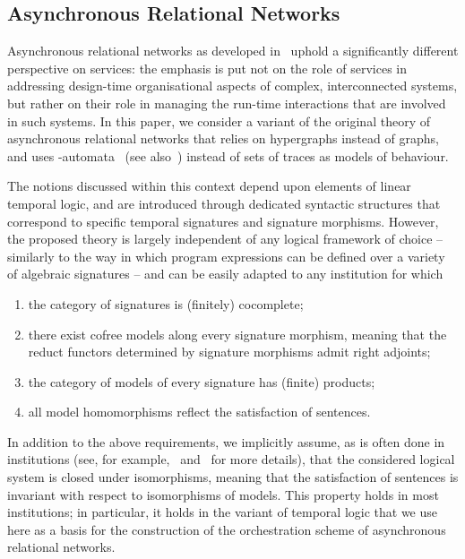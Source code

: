\documentclass{LMCS}
\begin{document}
\subsection{Asynchronous Relational Networks}
\label{subsection:asynchronous-relational-networks}

Asynchronous relational networks as developed in~\cite{Fiadeiro-Lopes:An-interface-theory-for-service-oriented-design-2013} uphold a significantly different perspective on services:  the emphasis is put not on the role of services in addressing design-time organisational aspects of complex, interconnected systems, but rather on their role in managing the run-time interactions that are involved in such systems.
In this paper, we consider a variant of the original theory of asynchronous relational networks that relies on hypergraphs instead of graphs, and uses \nb-automata~\cite{Thomas:Automata-on-infinite-objects-1990} (see also~\cite{Perrin-Pin:Infinite-Words-2004}) instead of sets of traces as models of behaviour.

The notions discussed within this context depend upon elements of linear temporal logic, and are introduced through dedicated syntactic structures that correspond to specific temporal signatures and signature morphisms.
However, the proposed theory is largely independent of any logical framework of choice -- similarly to the way in which program expressions can be defined over a variety of algebraic signatures -- and can be easily adapted to any institution for which
\begin{enumerate}

\item\label{assumption:ARN-first} the category of signatures is (finitely) cocomplete;

\item there exist cofree models along every signature morphism, meaning that the reduct functors determined by signature morphisms admit right adjoints;

\item the category of models of every signature has (finite) products;

\item\label{assumption:ARN-last} all model homomorphisms reflect the satisfaction of sentences.

\end{enumerate}

In addition to the above requirements, we implicitly assume, as is often done in institutions (see, for example,~\cite{Diaconescu:Institution-Independent-Model-Theory-2008} and~\cite{Sannella-Tarlecki:Foundations-of-Algebraic-Specification-2011} for more details), that the considered logical system is closed under isomorphisms, meaning that the satisfaction of sentences is invariant with respect to isomorphisms of models.  This property holds in most institutions; in particular, it holds in the variant of temporal logic that we use here as a basis for the construction of the orchestration scheme of asynchronous relational networks.
\end{document}
